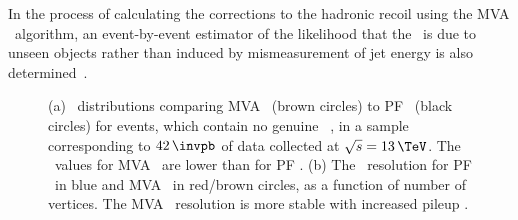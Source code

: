 In the process of calculating the corrections to the hadronic recoil using the MVA \MET~algorithm, an event-by-event
estimator of the likelihood that the \MET~is due to unseen objects rather than induced
by mismeasurement of jet energy is also determined~\cite{cms-met-run1}.

\begin{figure}[h!]
\begin{center}
\end{center}
\caption[\MET~distributions comparing MVA \MET~to PF \MET~for
\Zmm events, in a sample corresponding to $42\,\invpb$ of data collected
at \mbox{$\sqrt{s}=13\,\TeV$}.]{(a) \MET~distributions comparing MVA \MET~(brown circles) to \ac{PF} \MET~(black circles) for
\Zmm events, which contain no genuine \MET~, in a sample corresponding to $42\,\invpb$ of data collected at $\sqrt{s}=13\,\TeV$. The 
\MET~values for MVA \MET~are lower than for \ac{PF} \MET. (b) The \MET~resolution for \ac{PF} \MET~in blue and MVA \MET~in red/brown
circles, as a function of number of vertices. The MVA \MET~resolution is more stable with increased pileup \cite{cms-dp-mvamet}.}
\label{fig:objects_mvamet}
\end{figure}


